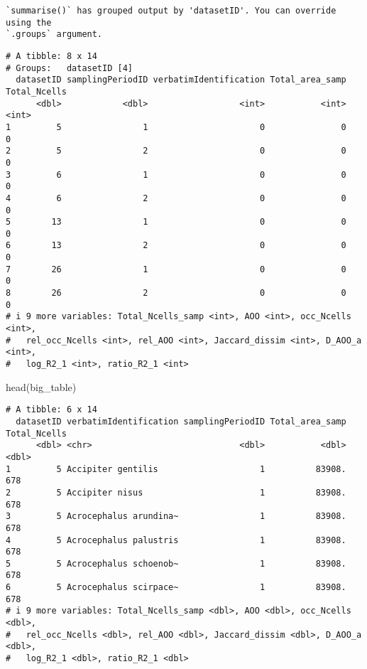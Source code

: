\documentclass[
  letterpaper,
  DIV=11,
  numbers=noendperiod]{scrreprt}
\newenvironment{Shaded}{\begin{snugshade}}{\end{snugshade}}
\newcommand{\FunctionTok}[1]{\textcolor[rgb]{0.28,0.35,0.67}{#1}}
\newcommand{\NormalTok}[1]{\textcolor[rgb]{0.00,0.23,0.31}{#1}}
\begin{document}
\begin{verbatim}
`summarise()` has grouped output by 'datasetID'. You can override using the
`.groups` argument.
\end{verbatim}

\begin{verbatim}
# A tibble: 8 x 14
# Groups:   datasetID [4]
  datasetID samplingPeriodID verbatimIdentification Total_area_samp Total_Ncells
      <dbl>            <dbl>                  <int>           <int>        <int>
1         5                1                      0               0            0
2         5                2                      0               0            0
3         6                1                      0               0            0
4         6                2                      0               0            0
5        13                1                      0               0            0
6        13                2                      0               0            0
7        26                1                      0               0            0
8        26                2                      0               0            0
# i 9 more variables: Total_Ncells_samp <int>, AOO <int>, occ_Ncells <int>,
#   rel_occ_Ncells <int>, rel_AOO <int>, Jaccard_dissim <int>, D_AOO_a <int>,
#   log_R2_1 <int>, ratio_R2_1 <int>
\end{verbatim}

\begin{Shaded}
\begin{Highlighting}[]
\FunctionTok{head}\NormalTok{(big\_table)}
\end{Highlighting}
\end{Shaded}

\begin{verbatim}
# A tibble: 6 x 14
  datasetID verbatimIdentification samplingPeriodID Total_area_samp Total_Ncells
      <dbl> <chr>                             <dbl>           <dbl>        <dbl>
1         5 Accipiter gentilis                    1          83908.          678
2         5 Accipiter nisus                       1          83908.          678
3         5 Acrocephalus arundina~                1          83908.          678
4         5 Acrocephalus palustris                1          83908.          678
5         5 Acrocephalus schoenob~                1          83908.          678
6         5 Acrocephalus scirpace~                1          83908.          678
# i 9 more variables: Total_Ncells_samp <dbl>, AOO <dbl>, occ_Ncells <dbl>,
#   rel_occ_Ncells <dbl>, rel_AOO <dbl>, Jaccard_dissim <dbl>, D_AOO_a <dbl>,
#   log_R2_1 <dbl>, ratio_R2_1 <dbl>
\end{verbatim}
\end{document}
